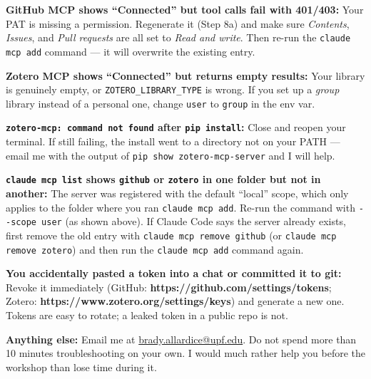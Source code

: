 \documentclass[11pt]{article}
\begin{document}
\textbf{GitHub MCP shows ``Connected'' but tool calls fail with 401/403:} Your PAT is missing a permission. Regenerate it (Step 8a) and make sure \emph{Contents}, \emph{Issues}, and \emph{Pull requests} are all set to \emph{Read and write}. Then re-run the \texttt{claude mcp add} command --- it will overwrite the existing entry.

\textbf{Zotero MCP shows ``Connected'' but returns empty results:} Your library is genuinely empty, or \texttt{ZOTERO\_LIBRARY\_TYPE} is wrong. If you set up a \emph{group} library instead of a personal one, change \texttt{user} to \texttt{group} in the env var.

\textbf{\texttt{zotero-mcp: command not found} after \texttt{pip install}:} Close and reopen your terminal. If still failing, the install went to a directory not on your PATH --- email me with the output of \texttt{pip show zotero-mcp-server} and I will help.

\textbf{\texttt{claude mcp list} shows \texttt{github} or \texttt{zotero} in one folder but not in another:} The server was registered with the default ``local'' scope, which only applies to the folder where you ran \texttt{claude mcp add}. Re-run the command with \texttt{-\/-scope user} (as shown above). If Claude Code says the server already exists, first remove the old entry with \texttt{claude mcp remove github} (or \texttt{claude mcp remove zotero}) and then run the \texttt{claude mcp add} command again.

\textbf{You accidentally pasted a token into a chat or committed it to git:} Revoke it immediately (GitHub: \textbf{https://github.com/settings/tokens}; Zotero: \textbf{https://www.zotero.org/settings/keys}) and generate a new one. Tokens are easy to rotate; a leaked token in a public repo is not.

\textbf{Anything else:} Email me at \href{mailto:brady.allardice@upf.edu}{brady.allardice@upf.edu}. Do not spend more than 10 minutes troubleshooting on your own. I would much rather help you before the workshop than lose time during it.
\end{document}
